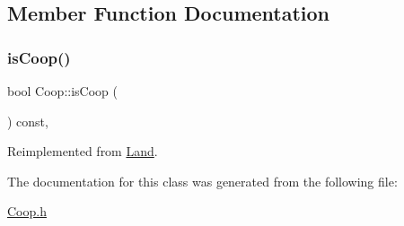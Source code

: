 \subsection{Member Function Documentation}
\mbox{\label{classCoop_af611b31347d3a8cf2304af22ecbfc450}} 
\subsubsection{\texorpdfstring{isCoop()}{isCoop()}}
{\footnotesize\ttfamily bool Coop\+::is\+Coop (\begin{DoxyParamCaption}{ }\end{DoxyParamCaption}) const\hspace{0.3cm}{\ttfamily [inline]}, {\ttfamily [virtual]}}



Reimplemented from \mbox{\hyperlink{classLand_a685f9ec0e771dbf0fe348dd13d467c4e}{Land}}.



The documentation for this class was generated from the following file\+:\begin{DoxyCompactItemize}
\item 
\mbox{\hyperlink{Coop_8h}{Coop.\+h}}\end{DoxyCompactItemize}
